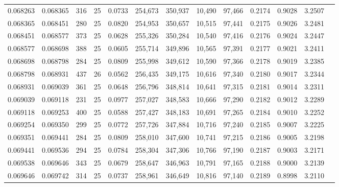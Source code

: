 \begin{tabular}{rrrrrrrrrrrrr}
0.068263 & 0.068365 &   316 &  25 &                                     0.0733 & 254,673 & 350,937 &  10,490 &  97,466 & 0.2174 & 0.9028 & 3.2507 \\
0.068365 & 0.068451 &   280 &  25 &                                     0.0820 & 254,953 & 350,657 &  10,515 &  97,441 & 0.2175 & 0.9026 & 3.2481 \\
0.068451 & 0.068577 &   373 &  25 &                                     0.0628 & 255,326 & 350,284 &  10,540 &  97,416 & 0.2176 & 0.9024 & 3.2447 \\
0.068577 & 0.068698 &   388 &  25 &                                     0.0605 & 255,714 & 349,896 &  10,565 &  97,391 & 0.2177 & 0.9021 & 3.2411 \\
0.068698 & 0.068798 &   284 &  25 &                                     0.0809 & 255,998 & 349,612 &  10,590 &  97,366 & 0.2178 & 0.9019 & 3.2385 \\
0.068798 & 0.068931 &   437 &  26 &                                     0.0562 & 256,435 & 349,175 &  10,616 &  97,340 & 0.2180 & 0.9017 & 3.2344 \\
0.068931 & 0.069039 &   361 &  25 &                                     0.0648 & 256,796 & 348,814 &  10,641 &  97,315 & 0.2181 & 0.9014 & 3.2311 \\
0.069039 & 0.069118 &   231 &  25 &                                     0.0977 & 257,027 & 348,583 &  10,666 &  97,290 & 0.2182 & 0.9012 & 3.2289 \\
0.069118 & 0.069253 &   400 &  25 &                                     0.0588 & 257,427 & 348,183 &  10,691 &  97,265 & 0.2184 & 0.9010 & 3.2252 \\
0.069254 & 0.069350 &   299 &  25 &                                     0.0772 & 257,726 & 347,884 &  10,716 &  97,240 & 0.2185 & 0.9007 & 3.2225 \\
0.069351 & 0.069441 &   284 &  25 &                                     0.0809 & 258,010 & 347,600 &  10,741 &  97,215 & 0.2186 & 0.9005 & 3.2198 \\
0.069441 & 0.069536 &   294 &  25 &                                     0.0784 & 258,304 & 347,306 &  10,766 &  97,190 & 0.2187 & 0.9003 & 3.2171 \\
0.069538 & 0.069646 &   343 &  25 &                                     0.0679 & 258,647 & 346,963 &  10,791 &  97,165 & 0.2188 & 0.9000 & 3.2139 \\
0.069646 & 0.069742 &   314 &  25 &                                     0.0737 & 258,961 & 346,649 &  10,816 &  97,140 & 0.2189 & 0.8998 & 3.2110 \\

\end{tabular}
